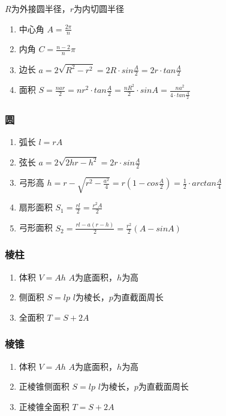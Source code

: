 \documentclass[landscape,twocolumn,a4paper]{article}
\begin{document}
$R$为外接圆半径，$r$为内切圆半径
\begin{enumerate}
	\item 中心角
	$A=\frac{2\pi}{n}$
	\item 内角
	$C=\frac{n-2}{n}\pi$
	\item 边长
	$a=2\sqrt{R^2-r^2}=2R \cdot sin\frac{A}{2}=2r \cdot tan\frac{A}{2}$
	\item 面积
	$S=\frac{nar}{2}=nr^2 \cdot tan\frac{A}{2}=\frac{nR^2}{2} \cdot sinA=\frac{na^2}{4 \cdot tan\frac{A}{2}}$
\end{enumerate}

\subsubsection{圆}

\begin{enumerate}
	\item 弧长
	$l=rA$
	\item 弦长
	$a=2\sqrt{2hr-h^2}=2r\cdot sin\frac{A}{2}$
	\item 弓形高
	$h=r-\sqrt{r^2-\frac{a^2}{4}}=r(1-cos\frac{A}{2})=\frac{1}{2} \cdot arctan\frac{A}{4}$
	\item 扇形面积
	$S_1=\frac{rl}{2}=\frac{r^2A}{2}$
	\item 弓形面积
	$S_2=\frac{rl-a(r-h)}{2}=\frac{r^2}{2}(A-sinA)$
\end{enumerate}

\subsubsection{棱柱}

\begin{enumerate}
	\item 体积
	$V=Ah$
	$A$为底面积，$h$为高
	\item 侧面积
	$S=lp$
	$l$为棱长，$p$为直截面周长
	\item 全面积
	$T=S+2A$
\end{enumerate}

\subsubsection{棱锥}

\begin{enumerate}
	\item 体积
	$V=Ah$
	$A$为底面积，$h$为高
	\item 正棱锥侧面积
	$S=lp$
	$l$为棱长，$p$为直截面周长
	\item 正棱锥全面积
	$T=S+2A$
\end{enumerate}
\end{document}

